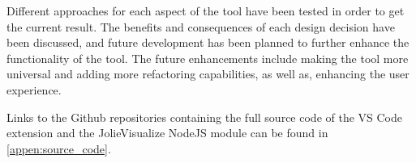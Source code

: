 Different approaches for each aspect of the tool have been tested in order to get the current result.
The benefits and consequences of each design decision have been discussed, and future development has been planned to further enhance the functionality of the tool. The future enhancements include making the tool more universal and adding more refactoring capabilities, as well as, enhancing the user experience.

Links to the Github repositories containing the full source code of the VS Code extension and the JolieVisualize NodeJS module can be found in \cref{appen:source_code}.
